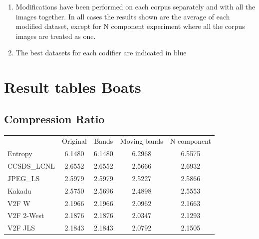 \documentclass{article}
\begin{document}
\begin{enumerate}
\begin{figure}[h!]
\end{figure}
    \item Modifications have been performed on each corpus separately and with all the images together. In all cases the results shown are the average of each modified dataset, except for N component experiment where all the corpus images are treated as one.
    \item The best datasets for each codifier are indicated in blue
    
\end{enumerate}
\newpage

\section*{Result tables Boats}
\subsection*{Compression Ratio}
\begin{table}[h]
\begin{tabular}{lcccc}
\rowcolor[HTML]{C0C0C0} 
 & Original & Bands & Moving bands & N component \\
\cellcolor[HTML]{C0C0C0}Entropy & \cellcolor[HTML]{E0E0E0} 6.1480 &  \cellcolor[HTML]{E0E0E0} 6.1480 &  \cellcolor[HTML]{E0E0E0} 6.2968 &  \cellcolor[HTML]{E0E0E0} 6.5575\\ 
\cellcolor[HTML]{C0C0C0}CCSDS\_LCNL & 2.6552 & 2.6552 & 2.5666 & \cellcolor[HTML]{DAE8FC}2.6932  \\
\cellcolor[HTML]{C0C0C0}JPEG\_LS    & \cellcolor[HTML]{DAE8FC}2.5979 & \cellcolor[HTML]{DAE8FC}2.5979 & 2.5227 & 2.5866  \\
\cellcolor[HTML]{C0C0C0}Kakadu      & \cellcolor[HTML]{DAE8FC}2.5750 & 2.5696 & 2.4898 & 2.5553  \\
\cellcolor[HTML]{C0C0C0}V2F W       & \cellcolor[HTML]{DAE8FC}2.1966 & \cellcolor[HTML]{DAE8FC}2.1966 & 2.0962 & 2.1663  \\
\cellcolor[HTML]{C0C0C0}V2F 2-West  & \cellcolor[HTML]{DAE8FC}2.1876 & \cellcolor[HTML]{DAE8FC}2.1876 & 2.0347 & 2.1293  \\
\cellcolor[HTML]{C0C0C0}V2F JLS     & \cellcolor[HTML]{DAE8FC}2.1843 & \cellcolor[HTML]{DAE8FC}2.1843 & 2.0792 & 2.1505  \\
\end{tabular}
\end{table}
\end{document}
